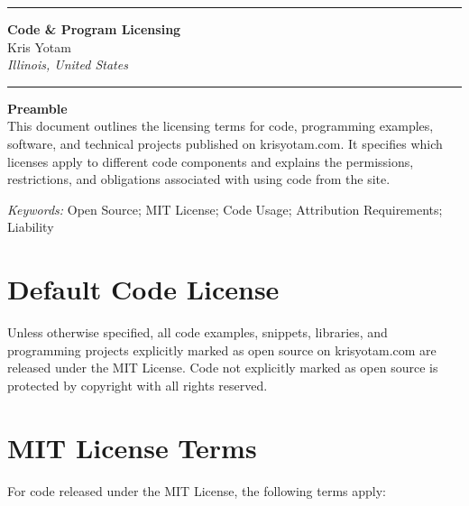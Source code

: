 \documentclass[11pt]{article}
\newcommand{\TitleLine}{\noindent\rule{\textwidth}{0.4pt}}
\begin{document}
\onehalfspacing

\vspace*{-1em}
\TitleLine
\vspace{0.5em}
\begin{center}
  {\Large\bfseries Code \& Program Licensing}\\[0.75em]
  {\normalsize Kris Yotam}\\
  {\itshape Illinois, United States}
\end{center}
\vspace{0.5em}
\TitleLine

\vspace{1.5em}

\noindent\textbf{Preamble}\\
This document outlines the licensing terms for code, programming examples, software, and technical projects published on krisyotam.com. It specifies which licenses apply to different code components and explains the permissions, restrictions, and obligations associated with using code from the site.

\vspace{0.75em}
\noindent\textit{Keywords:} Open Source; MIT License; Code Usage; Attribution Requirements; Liability

\vspace{1.5em}

\section{Default Code License}
Unless otherwise specified, all code examples, snippets, libraries, and programming projects explicitly marked as open source on krisyotam.com are released under the MIT License. Code not explicitly marked as open source is protected by copyright with all rights reserved.

\section{MIT License Terms}
For code released under the MIT License, the following terms apply:
\end{document}
